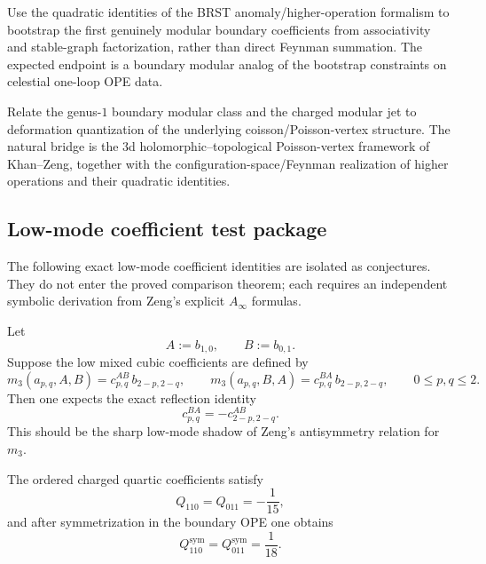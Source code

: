 \begin{problem}
Use the quadratic identities of the BRST anomaly/higher-operation formalism to bootstrap the
first genuinely modular boundary coefficients from associativity and stable-graph factorization,
rather than direct Feynman summation. The expected endpoint is a boundary modular analog of
the bootstrap constraints on celestial one-loop OPE data.
\end{problem}

\begin{problem}
Relate the genus-$1$ boundary modular class and the charged modular jet to deformation
quantization of the underlying coisson/Poisson-vertex structure. The natural bridge is the
$3$d holomorphic--topological Poisson-vertex framework of Khan--Zeng, together with the
configuration-space/Feynman realization of higher operations and their quadratic identities.
\end{problem}

\subsection{Low-mode coefficient test package}

The following exact low-mode coefficient identities are isolated as
conjectures. They do not enter the proved comparison theorem; each
requires an independent symbolic derivation from Zeng's explicit
$A_\infty$ formulas.

\begin{conjecture}
Let
\[
A:=b_{1,0},
\qquad
B:=b_{0,1}.
\]
Suppose the low mixed cubic coefficients are defined by
\[
m_3(a_{p,q},A,B)=c^{AB}_{p,q}\,b_{2-p,2-q},
\qquad
m_3(a_{p,q},B,A)=c^{BA}_{p,q}\,b_{2-p,2-q},
\qquad 0\le p,q\le 2.
\]
Then one expects the exact reflection identity
\[
c^{BA}_{p,q}=-c^{AB}_{2-p,2-q}.
\]
This should be the sharp low-mode shadow of Zeng's antisymmetry relation for $m_3$.
\end{conjecture}

\begin{conjecture}
The ordered charged quartic coefficients satisfy
\[
Q_{110}=Q_{011}=-\frac1{15},
\]
and after symmetrization in the boundary OPE one obtains
\[
Q_{110}^{\mathrm{sym}}=Q_{011}^{\mathrm{sym}}=\frac1{18}.
\]
\end{conjecture}

